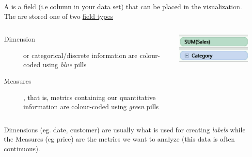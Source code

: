 \documentclass[xcolor=svgnames]{beamer} %
\begin{document}
\begin{frame}
A  is a field (i.e column in your data set) that can be placed in the visualization.  The are stored one of two \href{https://onlinehelp.tableau.com/current/pro/desktop/en-us/datafields\_typesandroles.htm}{field types}
\begin{columns}[T] %
\begin{column}{.7\textwidth}
\begin{description}
\item [Dimension] or categorical/discrete information are colour-coded using \emph{blue} pills 
\item [Measures], that is, metrics containing our quantitative information are colour-coded using \emph{green} pills \vfill
\end{description}
\end{column}%
\hfill%
\begin{column}{.2\textwidth}
\vspace{1cm}
\hspace{-1cm}
\includegraphics[width=1.3\textwidth]{img/pills.png}
\end{column}%
\end{columns}
\vspace{5mm}
Dimensions (eg. date, customer) are usually what is used for creating \textit{labels} while the Measures (eg price) are the metrics we want to analyze (this data is often continuous). 
\end{frame}
\end{document}
